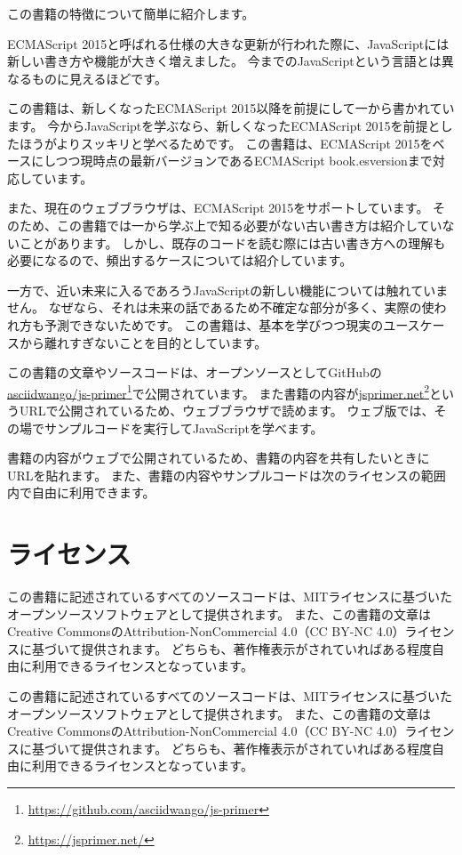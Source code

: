 この書籍の特徴について簡単に紹介します。

ECMAScript 2015と呼ばれる仕様の大きな更新が行われた際に、JavaScriptには新しい書き方や機能が大きく増えました。
今までのJavaScriptという言語とは異なるものに見えるほどです。

この書籍は、新しくなったECMAScript 2015以降を前提にして一から書かれています。
今からJavaScriptを学ぶなら、新しくなったECMAScript 2015を前提としたほうがよりスッキリと学べるためです。
この書籍は、ECMAScript 2015をベースにしつつ現時点の最新バージョンであるECMAScript {{book.esversion}}まで対応しています。

また、現在のウェブブラウザは、ECMAScript 2015をサポートしています。
そのため、この書籍では一から学ぶ上で知る必要がない古い書き方は紹介していないことがあります。
しかし、既存のコードを読む際には古い書き方への理解も必要になるので、頻出するケースについては紹介しています。

一方で、近い未来に入るであろうJavaScriptの新しい機能については触れていません。
なぜなら、それは未来の話であるため不確定な部分が多く、実際の使われ方も予測できないためです。
この書籍は、基本を学びつつ現実のユースケースから離れすぎないことを目的としています。

この書籍の文章やソースコードは、オープンソースとしてGitHubの\href{https://github.com/asciidwango/js-primer}{asciidwango/js-primer}\footnote{\url{https://github.com/asciidwango/js-primer}}で公開されています。
また書籍の内容が\href{https://jsprimer.net/}{jsprimer.net}\footnote{\url{https://jsprimer.net/}}というURLで公開されているため、ウェブブラウザで読めます。
ウェブ版では、その場でサンプルコードを実行してJavaScriptを学べます。

書籍の内容がウェブで公開されているため、書籍の内容を共有したいときにURLを貼れます。
また、書籍の内容やサンプルコードは次のライセンスの範囲内で自由に利用できます。

\hypertarget{license}{%
\section*{ライセンス}\label{license}}

この書籍に記述されているすべてのソースコードは、MITライセンスに基づいたオープンソースソフトウェアとして提供されます。
また、この書籍の文章はCreative CommonsのAttribution-NonCommercial
4.0（CC BY-NC 4.0）ライセンスに基づいて提供されます。
どちらも、著作権表示がされていればある程度自由に利用できるライセンスとなっています。

この書籍に記述されているすべてのソースコードは、MITライセンスに基づいたオープンソースソフトウェアとして提供されます。
また、この書籍の文章はCreative CommonsのAttribution-NonCommercial 4.0（CC BY-NC 4.0）ライセンスに基づいて提供されます。
どちらも、著作権表示がされていればある程度自由に利用できるライセンスとなっています。

